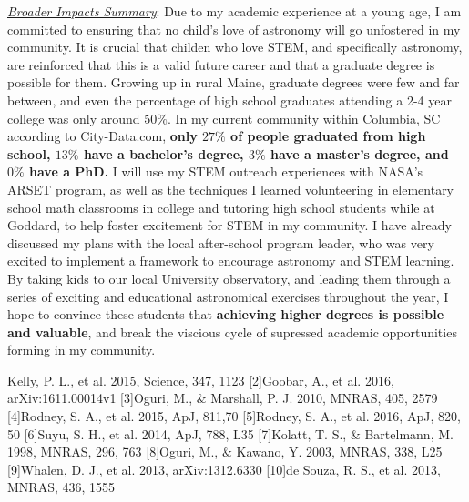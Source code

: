 \noindent\underline{\textit{Broader Impacts Summary}}:
Due to my academic experience at a young age, I am committed to
ensuring that no child's love of astronomy will go unfostered in my
community. It is crucial that childen who love STEM, and specifically
astronomy, are reinforced that this is a valid future career and that
a graduate degree is possible for them. Growing up in rural Maine,
graduate degrees were few and far between, and even the percentage of
high school graduates attending a 2-4 year college was only around
50$\%$. In my current community within Columbia, SC according to
City-Data.com, \textbf{only $27\%$ of people graduated from high
school, $13\%$ have a bachelor's degree, $3\%$ have a master's degree,
and $0\%$ have a PhD.} I will use my STEM outreach experiences with
NASA's ARSET program, as well as the techniques I learned volunteering
in elementary school math classrooms in college and tutoring high
school students while at Goddard, to help foster excitement for STEM
in my community. I have already discussed my plans with the local
after-school program leader, who was very excited to implement a
framework to encourage astronomy and STEM learning. By taking kids to
our local University observatory, and leading them through a series of
exciting and educational astronomical exercises throughout the year, I
hope to convince these students that \textbf{achieving higher degrees
is possible and valuable}, and break the viscious cycle of supressed
academic opportunities forming in my community.

\noindent\fontsize{10}{14}\selectfont
[1]Kelly, P. L., et al. 2015, Science, 347, 1123 [2]Goobar, A., et
al. 2016, arXiv:1611.00014v1 [3]Oguri, M., $\&$ Marshall, P. J. 2010,
MNRAS, 405, 2579 [4]Rodney, S. A., et al. 2015, ApJ, 811,70
[5]Rodney, S. A., et al. 2016, ApJ, 820, 50 [6]Suyu, S. H., et
al. 2014, ApJ, 788, L35 [7]Kolatt, T. S., $\&$ Bartelmann, M. 1998,
MNRAS, 296, 763 [8]Oguri, M., $\&$ Kawano, Y. 2003, MNRAS, 338, L25
[9]Whalen, D. J., et al. 2013, arXiv:1312.6330 [10]de Souza, R. S., et al. 2013, MNRAS, 436, 1555
\pagebreak





